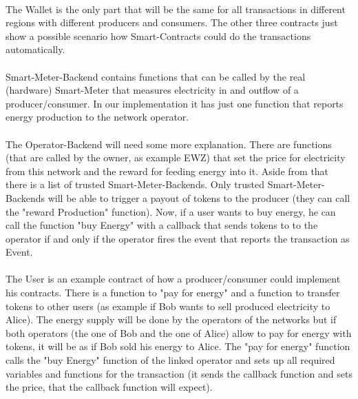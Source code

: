 \documentclass{scrartcl}
\begin{document}
	\paragraph{}
	The Wallet is the only part that will be the same for all transactions in different regions with different producers and consumers. The other three contracts just show a possible scenario how Smart-Contracts could do the transactions automatically.
	
	\paragraph{}
	Smart-Meter-Backend contains functions that can be called by the real (hardware) Smart-Meter that measures electricity in and outflow of a producer/consumer. In our implementation it has just one function that reports energy production to the network operator.
	
	\paragraph{}
	The Operator-Backend will need some more explanation. There are functions (that are called by the owner, as example EWZ) that set the price for electricity from this network and the reward for feeding energy into it. Aside from that there is a list of trusted Smart-Meter-Backends. Only trusted Smart-Meter-Backends will be able to trigger a payout of tokens to the producer (they can call the "reward Production" function). Now, if a user wants to buy energy, he can call the function "buy Energy" with a callback that sends tokens to to the operator if and only if the operator fires the event that reports the transaction as Event.
	
	\paragraph{}
	The User is an example contract of how a producer/consumer could implement his contracts. There is a function to "pay for energy" and a function to transfer tokens to other users (as example if Bob wants to sell produced electricity to Alice). The energy supply will be done by the operators of the networks but if both operators (the one of Bob and the one of Alice) allow to pay for energy with tokens, it will be as if Bob sold his energy to Alice. The "pay for energy" function calls the "buy Energy" function of the linked operator and sets up all required variables and functions for the transaction (it sends the callback function and sets the price, that the callback function will expect).
	
\end{document}
